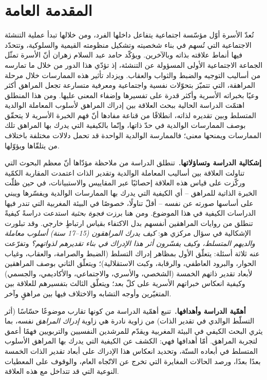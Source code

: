 \chapter*{المقدمة العامة}

تُعدّ الأسرة أوّل مؤسّسة اجتماعية يتفاعل داخلها الفرد، ومن خلالها تبدأ عملية التنشئة الاجتماعية
التي تُسهم في بناء شخصيته وتشكيل منظومته القيمية والسلوكية، وتتحدّد فيها أنماط علاقته بذاته
وبالآخرين. ويؤكّد حامد عبد السلام زهران أنّ الأسرة تمثّل الجماعة الاجتماعية الأولى المسؤولة عن
التنشئة، إذ تؤدّي هذا الدور من خلال ما تمارسه من أساليب التوجيه والضبط والثواب والعقاب. ويزداد
تأثير هذه الممارسات خلال مرحلة المراهقة، التي تتميّز بتحوّلات نفسية واجتماعية ومعرفية متسارعة
تجعل المراهق أكثر وعيًا بخبراته الأسرية وأكثر قدرة على تفسيرها وإضفاء المعنى عليها. ومن هذا
المنطلق اهتمّت الدراسة الحالية ببحث العلاقة بين إدراك المراهق لأسلوب المعاملة الوالدية المتسلط
وبين تقديره لذاته، انطلاقًا من قناعة مفادها أنّ فهم الخبرة الأسرية لا يتحقّق بوصف الممارسات
الوالدية في حدّ ذاتها، وإنّما بالكيفية التي يدرك بها المراهق تلك الممارسات ويمنحها معنى؛ فالممارسة
الوالدية الواحدة قد تحمل دلالات مختلفة باختلاف من يتلقّاها ويؤوّلها.

\medskip
\noindent\textbf{إشكالية الدراسة وتساؤلاتها.}\ تنطلق الدراسة من ملاحظة مؤدّاها أنّ معظم البحوث
التي تناولت العلاقة بين أساليب المعاملة الوالدية وتقدير الذات اعتمدت المقاربة الكمّية وركّزت على
قياس هذه العلاقة إحصائيًا عبر المقاييس والاستبيانات، في حين ظلّت الخبرة الذاتية للمراهق -- أي
الكيفية التي يدرك بها الممارسات الوالدية ويفسّرها ويبني على أساسها صورته عن نفسه -- أقلّ تناولًا،
خصوصًا في البيئة المغربية التي تندر فيها الدراسات الكيفية في هذا الموضوع. ومن هنا برزت \emph{فجوة
بحثية} استدعت دراسةً كيفيةً تنطلق من روايات المراهقين أنفسهم بدل الاكتفاء بقياس ارتباطٍ خارجي.
وقد تبلورت الإشكالية في سؤال مركزي هو: \emph{كيف يدرك المراهقون (15--17 سنة) أسلوب معاملة والديهم
المتسلط، وكيف يفسّرون أثر هذا الإدراك في بناء تقديرهم لذواتهم؟} وتفرّعت عنه ثلاثة أسئلة: يتعلّق
الأول بمظاهر إدراك التسلط (الضبط والصرامة، والعقاب، وغياب الحوار، والبرود العاطفي، والرقابة، وكبت
الاستقلالية)؛ ويتعلّق الثاني بوصف المراهقين لأبعاد تقدير ذاتهم الخمسة (الشخصي، والأسري،
والاجتماعي، والأكاديمي، والجسمي) وكيفية انعكاس خبراتهم الأسرية على كلّ بعد؛ ويتعلّق الثالث
بتفسيرهم للعلاقة بين المتغيّرين وأوجه التشابه والاختلاف فيها بين مراهقٍ وآخر.

\medskip
\noindent\textbf{أهمّية الدراسة وأهدافها.}\ تنبع أهمّية الدراسة من كونها تقارب موضوعًا حسّاسًا
(أثر التسلّط الوالدي في تقدير الذات) من زاوية نادرة هي زاوية \emph{إدراك المراهق} نفسه، بما يثري
البحث الكيفي في البيئة المغربية ويقدّم للمرشدين النفسيين والتربويين فهمًا أعمق لتجربة المراهق.
أمّا أهدافها فهي: الكشف عن الكيفية التي يدرك بها المراهق الأسلوب المتسلط في أبعاده الستّة، وتحديد
انعكاس هذا الإدراك على أبعاد تقدير الذات الخمسة بعدًا بعدًا، ورصد الحالات المغايرة التي تخرج عن
الاتّجاه العام، والوقوف على المعطيات النوعية التي قد تتداخل مع هذه العلاقة.

